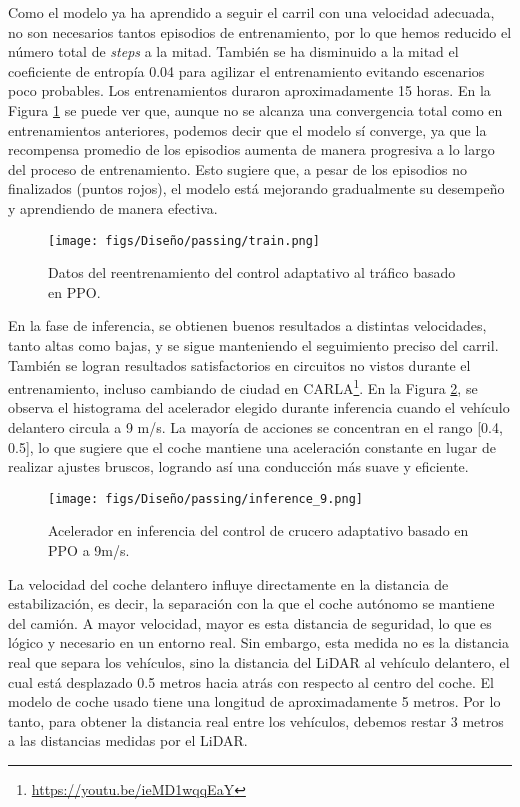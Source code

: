 Como el modelo ya ha aprendido a seguir el carril con una velocidad adecuada, no son necesarios tantos episodios de entrenamiento, por lo que hemos reducido el número total de \textit{steps} a la mitad. También se ha disminuido a la mitad el coeficiente de entropía 0.04 para agilizar el entrenamiento evitando escenarios poco probables. Los entrenamientos duraron aproximadamente 15 horas. En la Figura \ref{fig:train_traffic} se puede ver que, aunque no se alcanza una convergencia total como en entrenamientos anteriores, podemos decir que el modelo sí converge, ya que la recompensa promedio de los episodios aumenta de manera progresiva a lo largo del proceso de entrenamiento. Esto sugiere que, a pesar de los episodios no finalizados (puntos rojos), el modelo está mejorando gradualmente su desempeño y aprendiendo de manera efectiva.
\begin{figure}[ht]
\centering
\texttt{[image: figs/Diseño/passing/train.png]}
\caption{Datos del reentrenamiento del control adaptativo al tráfico basado en \ac{PPO}.}
\label{fig:train_traffic}
\end{figure}

En la fase de inferencia, se obtienen buenos resultados a distintas velocidades, tanto altas como bajas, y se sigue manteniendo el seguimiento preciso del carril. También se logran resultados satisfactorios en circuitos no vistos durante el entrenamiento, incluso cambiando de ciudad en CARLA\footnote{\url{https://youtu.be/ieMD1wqqEaY}}. En la Figura \ref{fig:infrence_passing}, se observa el histograma del acelerador elegido durante inferencia cuando el vehículo delantero circula a 9 m/s. La mayoría de acciones se concentran en el rango [0.4, 0.5], lo que sugiere que el coche mantiene una aceleración constante en lugar de realizar ajustes bruscos, logrando así una conducción más suave y eficiente.

\begin{figure}[ht]
\centering
\texttt{[image: figs/Diseño/passing/inference\_9.png]}
\caption{Acelerador en inferencia del control de crucero adaptativo basado en \ac{PPO} a 9m/s.}
\label{fig:infrence_passing}
\end{figure}

La velocidad del coche delantero influye directamente en la distancia de estabilización, es decir, la separación con la que el coche autónomo se mantiene del camión. A mayor velocidad, mayor es esta distancia de seguridad, lo que es lógico y necesario en un entorno real. Sin embargo, esta medida no es la distancia real que separa los vehículos, sino la distancia del \ac{LiDAR} al vehículo delantero, el cual está desplazado 0.5 metros hacia atrás con respecto al centro del coche. El modelo de coche usado tiene una longitud de aproximadamente 5 metros. Por lo tanto, para obtener la distancia real entre los vehículos, debemos restar 3 metros a las distancias medidas por el \ac{LiDAR}.

